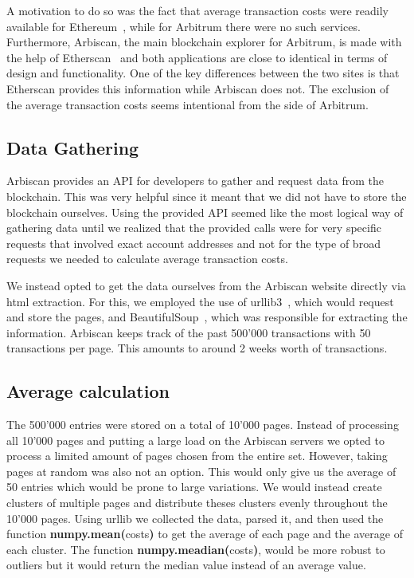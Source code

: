 \documentclass[a4paper,oneside,openright,11pt]{report}
\begin{document}
A motivation to do so was the fact that average transaction costs were readily available for 
Ethereum~\cite{EthTxCost}, while for Arbitrum there were no such services.
Furthermore, Arbiscan, the main blockchain explorer for Arbitrum, is made 
with the help of Etherscan~\cite{ArbEthScan} and both applications are close to identical in terms
of design and functionality. One of the key differences between the two sites is that Etherscan 
provides this information while Arbiscan does not. The exclusion of the average transaction costs
seems intentional from the side of Arbitrum.

\subsection{Data Gathering}
	Arbiscan provides an API for developers to gather and request data from the blockchain. 
	This was very helpful since it meant that we did not have to store the blockchain ourselves.
	Using the provided API seemed like the most logical way of gathering data until we realized
	that the provided calls were for very specific requests that involved exact account addresses 
	and not for the type of broad requests we needed to calculate average transaction costs.
	
	We instead opted to get the data ourselves from the Arbiscan website directly via html extraction.
	For this, we employed the use of urllib3~\cite{UrlLib3}, which would request and store the pages, and 
	BeautifulSoup~\cite{BS}, which was responsible for extracting the information.
	Arbiscan keeps track of the past 500'000 transactions with 50 transactions per page. 
	This amounts to around 2 weeks worth of transactions. 
	
	\subsection{Average calculation}
	The 500'000 entries were stored on a total of 10'000 pages. 
	Instead of processing all 10'000 pages and putting a large load on the Arbiscan servers 
	we opted to process a limited amount of pages chosen from the entire set.
	However, taking pages at random was also not an option. This would only 
	give us the average of 50 entries which would be prone to large variations. 
	We would instead create clusters of multiple pages and 	distribute theses clusters 
	evenly throughout the 10'000 pages.
	Using urllib we collected the data, parsed it, and then used the function 
	\textbf{numpy.mean(}costs\textbf{)} to get the average of each page and the average of
	each cluster. The function \textbf{numpy.meadian(}costs\textbf{)}, would be more robust
	to outliers but it would return the median value instead of an average value.
\end{document}
